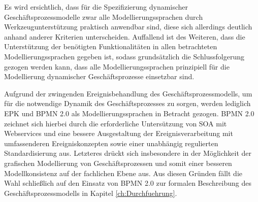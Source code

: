 Es wird ersichtlich, dass für die Spezifizierung dynamischer Geschäftsprozessmodelle zwar alle Modellierungssprachen durch Werkzeugunterstützung praktisch anwendbar sind, diese sich allerdings deutlich anhand anderer Kriterien unterscheiden. Auffallend ist des Weiteren, dass die Unterstützung der benötigten Funktionalitäten in allen betrachteten Modellierungssprachen gegeben ist, sodass grundsätzlich die Schlussfolgerung gezogen werden kann, dass alle Modellierungssprachen prinzipiell für die Modellierung dynamischer Geschäftsprozesse einsetzbar sind. 

Aufgrund der zwingenden Ereignisbehandlung des Geschäftsprozessmodells, um für die notwendige Dynamik des Geschäftsprozesses zu sorgen, werden lediglich \ac{EPK} und \ac{BPMN} 2.0 als Modellierungssprachen in Betracht gezogen. 
\ac{BPMN} 2.0 zeichnet sich hierbei durch die erforderliche Untersützung von SOA mit Webservices und eine bessere Ausgestaltung der Ereignisverarbeitung mit umfassenderen Ereigniskonzepten sowie einer unabhängig regulierten Standardisierung aus. Letzteres drückt sich insbesondere in der Möglichkeit der grafischen Modellierung von Geschäftsprozessen und somit einer besseren Modellkonsistenz auf der fachlichen Ebene aus. Aus diesen Gründen fällt die Wahl schließlich auf den Einsatz von \ac{BPMN} 2.0 zur formalen Beschreibung des Geschäftsprozessmodells in Kapitel \ref{ch:Durchfuehrung}. 
